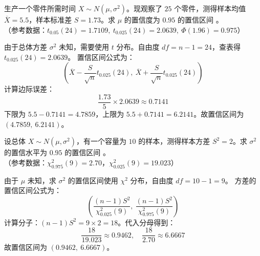 ﻿\documentclass[lang=cn,11pt]{elegantbook}
\begin{document}
\begin{exercise} \label{prob:ci_2}
生产一个零件所需时间 $X \sim N(\mu, \sigma^2)$。现观察了 $25$ 个零件，测得样本均值 $\overline{X}=5.5$，样本标准差 $S=1.73$。求 $\mu$ 的置信度为 $0.95$ 的置信区间 \underline{\qquad\qquad}。\\
（参考数据：$t_{0.05}(24)=1.7109,\ t_{0.025}(24)=2.0639,\ \Phi(1.96)=0.975$）
\end{exercise}
\begin{solution}
由于总体方差 $\sigma^2$ 未知，需要使用 $t$ 分布。自由度 $df = n-1 = 24$，查表得 $t_{0.025}(24)=2.0639$。
置信区间公式为：
\begin{equation*}
\left( \overline{X}-\frac{S}{\sqrt{n}}t_{0.025}(24),\ \overline{X}+\frac{S}{\sqrt{n}}t_{0.025}(24) \right)
\end{equation*}
计算边际误差：
\begin{equation*}
\frac{1.73}{5} \times 2.0639 \approx 0.7141
\end{equation*}
下限为 $5.5 - 0.7141 = 4.7859$，上限为 $5.5 + 0.7141 = 6.2141$。故置信区间为 $(4.7859,\ 6.2141)$。
\end{solution}

\begin{exercise} \label{prob:ci_3}
设总体 $X \sim N(\mu, \sigma^2)$，有一个容量为 $10$ 的样本，测得样本方差 $S^2=2$。求 $\sigma^2$ 的置信水平为 $0.95$ 的置信区间 \underline{\qquad\qquad}。\\
（参考数据：$\chi^2_{0.975}(9)=2.70$，$\chi^2_{0.025}(9)=19.023$）
\end{exercise}
\begin{solution}
由于 $\mu$ 未知，求 $\sigma^2$ 的置信区间使用 $\chi^2$ 分布，自由度 $df = 10-1 = 9$。
方差的置信区间公式为：
\begin{equation*}
\left( \frac{(n-1)S^2}{\chi^2_{0.025}(9)},\ \frac{(n-1)S^2}{\chi^2_{0.975}(9)} \right)
\end{equation*}
计算分子：$(n-1)S^2 = 9 \times 2 = 18$。代入分母得到：
\begin{equation*}
\frac{18}{19.023} \approx 0.9462,\quad \frac{18}{2.70} \approx 6.6667
\end{equation*}
故置信区间为 $(0.9462,\ 6.6667)$。
\end{solution}
\end{document}
